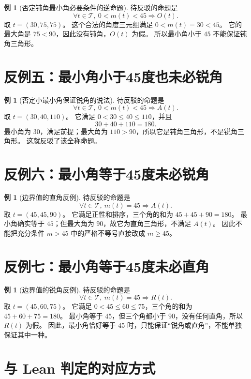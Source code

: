 \documentclass[UTF8,a4paper,zihao=-4,oneside,openany,fontset=fandol]{ctexbook}
\theoremstyle{definition}
\newtheorem{example}[theorem]{例}
\theoremstyle{remark}
\begin{document}
\begin{example}[否定钝角最小角必要条件的逆命题]
待反驳的命题是
\[
\forall t\in\mathcal T,\ 0<m(t)<45\Longrightarrow O(t).
\]
取 $t=(30,75,75)$。
这个合法的角度三元组满足 $0<m(t)=30<45$。
它的最大角是 $75<90$，因此没有钝角，$O(t)$ 为假。
所以最小角小于 $45$ 不能保证钝角三角形。
\end{example}

\section{反例五：最小角小于45度也未必锐角}

\begin{example}[否定小最小角保证锐角的说法]
待反驳的命题是
\[
\forall t\in\mathcal T,\ 0<m(t)<45\Longrightarrow A(t).
\]
取 $t=(30,40,110)$。
它满足 $0<30\le40\le110$，并且
\[
30+40+110=180.
\]
最小角为 $30$，满足前提；最大角为 $110>90$，所以它是钝角三角形，不是锐角三角形。
这就反驳了该全称命题。
\end{example}

\section{反例六：最小角等于45度未必锐角}

\begin{example}[边界值的直角反例]
待反驳的命题是
\[
\forall t\in\mathcal T,\ m(t)=45\Longrightarrow A(t).
\]
取 $t=(45,45,90)$。
它满足正性和排序，三个角的和为 $45+45+90=180$。
最小角确实等于 $45$；但最大角为 $90$，故它为直角三角形，不满足 $A(t)$。
因此不能把充分条件 $m>45$ 中的严格不等号直接改成 $m\ge45$。
\end{example}

\section{反例七：最小角等于45度未必直角}

\begin{example}[边界值的锐角反例]
待反驳的命题是
\[
\forall t\in\mathcal T,\ m(t)=45\Longrightarrow R(t).
\]
取 $t=(45,60,75)$。
它满足 $0<45\le60\le75$，三个角的和为 $45+60+75=180$。
最小角等于 $45$，但三个角都小于 $90$，没有任何直角，所以 $R(t)$ 为假。
因此，最小角恰好等于 $45$ 时，只能保证“锐角或直角”，不能单独保证其中一种。
\end{example}

\section{与 Lean 判定的对应方式}
\end{document}
